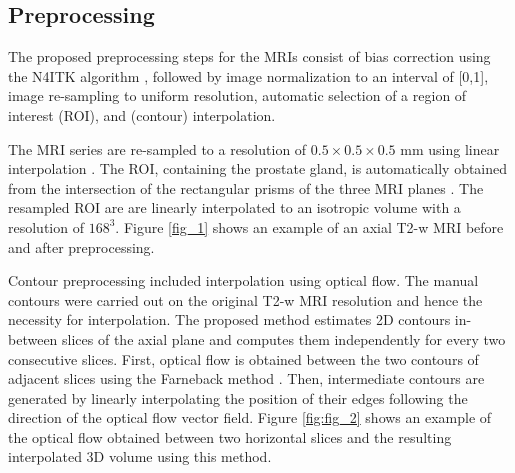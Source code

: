 \subsection{Preprocessing}
\label{subsec:prepro}
The proposed preprocessing steps for the MRIs consist of bias correction using the N4ITK algorithm \cite{n4itk}, followed by image normalization to an interval of [0,1],  image re-sampling to uniform resolution, automatic selection of a region of interest (ROI), and (contour) interpolation.  

The MRI series are re-sampled to a resolution of $0.5 \times 0.5 \times 0.5$ mm  using linear interpolation \cite{itk}. The ROI, containing the prostate gland, is automatically obtained from the intersection of the rectangular prisms of the three MRI planes \cite{anneke}. The resampled ROI are  are linearly interpolated to an isotropic volume with a resolution of $168^3$. Figure \ref{fig_1} shows an example of an axial T2-w MRI before and after preprocessing.

Contour preprocessing included interpolation using optical flow.  The manual contours were carried out on the original T2-w MRI resolution and hence the necessity for interpolation. The proposed method estimates 2D contours in-between slices of the axial plane and computes them independently for every two consecutive slices. First, optical flow is obtained between the two contours of adjacent slices using the Farneback method \cite{optflow}. Then, intermediate contours are generated by linearly interpolating the position of their edges following the direction of the optical flow vector field. Figure \ref{fig:fig_2} shows an example of the optical flow obtained between two horizontal slices and the resulting interpolated 3D volume using this method. 
